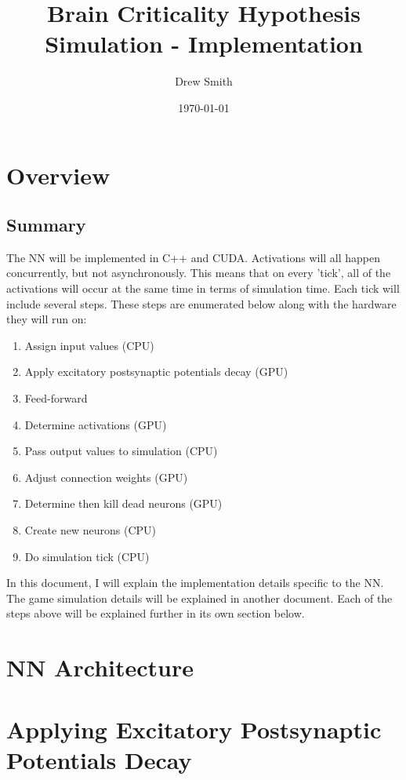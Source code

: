 \documentclass{article} %
\title{Brain Criticality Hypothesis Simulation - Implementation} %
\author{Drew Smith} %
\date{\today} %
\begin{document}
    \maketitle %
    
    \section{Overview}
        \subsection{Summary}
            The NN will be implemented in C++ and CUDA. Activations will all happen concurrently, but not asynchronously. This means that on every 'tick', all of the activations will occur at the same time in terms of simulation time. Each tick will include several steps. These steps are enumerated below along with the hardware they will run on:
            \begin{enumerate}[noitemsep]
                \item Assign input values (CPU)
                \item Apply excitatory postsynaptic potentials decay (GPU)
                \item Feed-forward
                \item Determine activations (GPU)
                \item Pass output values to simulation (CPU)
                \item Adjust connection weights (GPU)
                \item Determine then kill dead neurons (GPU)
                \item Create new neurons (CPU)
                \item Do simulation tick (CPU)
            \end{enumerate}

            In this document, I will explain the implementation details specific to the NN. The game simulation details will be explained in another document. Each of the steps above will be explained further in its own section below.
    \section{NN Architecture}
    \section{Applying Excitatory Postsynaptic Potentials Decay}
\end{document}

